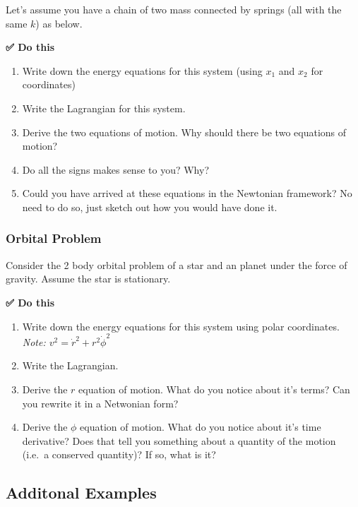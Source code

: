 Let's assume you have a chain of two mass connected by springs (all with
the same \(k\)) as below.

\textbf{✅ Do this}

\begin{enumerate}
\def\labelenumi{\arabic{enumi}.}
\tightlist
\item
  Write down the energy equations for this system (using \(x_1\) and
  \(x_2\) for coordinates)
\item
  Write the Lagrangian for this system.
\item
  Derive the two equations of motion. Why should there be two equations
  of motion?
\item
  Do all the signs makes sense to you? Why?
\item
  Could you have arrived at these equations in the Newtonian framework?
  No need to do so, just sketch out how you would have done it.
\end{enumerate}

\subsubsection{Orbital Problem}\label{orbital-problem}

Consider the 2 body orbital problem of a star and an planet under the
force of gravity. Assume the star is stationary.

\textbf{✅ Do this}

\begin{enumerate}
\def\labelenumi{\arabic{enumi}.}
\tightlist
\item
  Write down the energy equations for this system using polar
  coordinates. \emph{Note: \(v^2 = \dot{r}^2 + r^2\dot{\phi}^2\)}
\item
  Write the Lagrangian.
\item
  Derive the \(r\) equation of motion. What do you notice about it's
  terms? Can you rewrite it in a Netwonian form?
\item
  Derive the \(\phi\) equation of motion. What do you notice about it's
  time derivative? Does that tell you something about a quantity of the
  motion (i.e.~a conserved quantity)? If so, what is it?
\end{enumerate}

\subsection{Additonal Examples}\label{additonal-examples}

